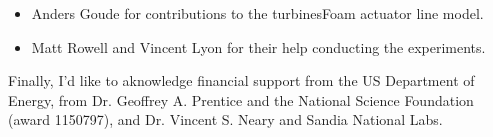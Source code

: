 \begin{Acknowledgments}
{\begin{itemize}
        \item Anders Goude for contributions to the turbinesFoam actuator line
        model.

        \item Matt Rowell and Vincent Lyon for their help conducting the
        experiments.

    \end{itemize}

    Finally, I'd like to aknowledge financial support from the US Department of
    Energy, from Dr. Geoffrey A. Prentice and the National Science Foundation
    (award 1150797), and Dr. Vincent S. Neary and Sandia National Labs.

}
\end{Acknowledgments}
